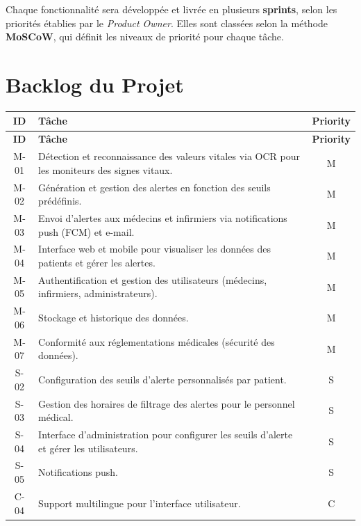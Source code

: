 Chaque fonctionnalité sera développée et livrée en plusieurs \textbf{sprints}, selon les priorités établies par le \textit{Product Owner}. Elles sont classées selon la méthode \textbf{MoSCoW}, qui définit les niveaux de priorité pour chaque tâche.

\section*{Backlog du Projet}
\label{sec:backlog_projet} 

\begin{longtable}{|c|p{9cm}|c|}
    \hline
    \textbf{ID} & \textbf{Tâche} & \textbf{Priority} \\
    \hline
    \endfirsthead
    \hline
    \textbf{ID} & \textbf{Tâche} & \textbf{Priority} \\
    \hline
    \endhead
    \endfoot
    M-01& Détection et reconnaissance des valeurs vitales via OCR pour les moniteurs des signes vitaux. & M \\
    \hline
    M-02 & Génération et gestion des alertes en fonction des seuils prédéfinis. & M \\
    \hline
    M-03 & Envoi d’alertes aux médecins et infirmiers via notifications push (FCM) et e-mail. & M \\
    \hline
    M-04 & Interface web et mobile pour visualiser les données des patients et gérer les alertes. & M \\
    \hline
    M-05 & Authentification et gestion des utilisateurs (médecins, infirmiers, administrateurs). & M \\
    \hline
    M-06 & Stockage et historique des données. & M \\
    \hline
    M-07 & Conformité aux réglementations médicales (sécurité des données). & M \\
    \hline
    S-02 & Configuration des seuils d’alerte personnalisés par patient. & S \\
    \hline
    S-03 & Gestion des horaires de filtrage des alertes pour le personnel médical. & S \\
    \hline
    S-04 & Interface d’administration pour configurer les seuils d’alerte et gérer les utilisateurs. & S \\
    \hline
    S-05 & Notifications push. & S \\
    \hline
    C-04 & Support multilingue pour l’interface utilisateur. & C \\

\end{longtable}
